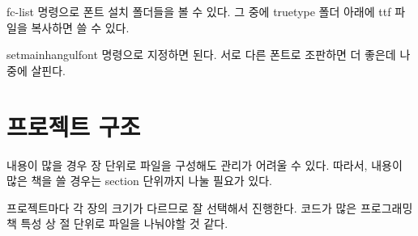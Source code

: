 fc-list 명령으로 폰트 설치 폴더들을 볼 수 있다. 그 중에 truetype 폴더 아래에 
ttf 파일을 복사하면 쓸 수 있다. 

setmainhangulfont 명령으로 지정하면 된다. 서로 다른 폰트로 조판하면 더 좋은데 
나중에 살핀다. 

\section{프로젝트 구조}

내용이 많을 경우 장 단위로 파일을 구성해도 관리가 어려울 수 있다. 따라서, 내용이 
많은 책을 쓸 경우는 section 단위까지 나눌 필요가 있다. 

프로젝트마다 각 장의 크기가 다르므로 잘 선택해서 진행한다. 코드가 많은 프로그래밍 책 
특성 상 절 단위로 파일을 나눠야할 것 같다. 



